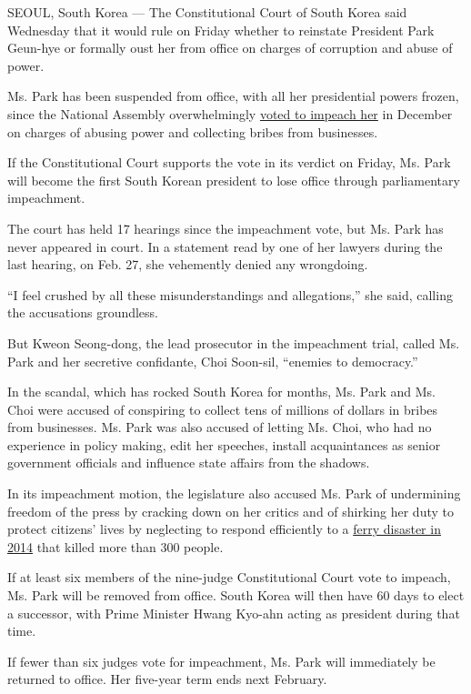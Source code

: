 SEOUL, South Korea --- The Constitutional Court of South Korea said
Wednesday that it would rule on Friday whether to reinstate President
Park Geun-hye or formally oust her from office on charges of corruption
and abuse of power.

Ms. Park has been suspended from office, with all her presidential
powers frozen, since the National Assembly overwhelmingly
\href{https://www.nytimes.com/2016/12/09/world/asia/south-korea-president-park-geun-hye-impeached.html}{voted
to impeach her} in December on charges of abusing power and collecting
bribes from businesses.

If the Constitutional Court supports the vote in its verdict on Friday,
Ms. Park will become the first South Korean president to lose office
through parliamentary impeachment.

The court has held 17 hearings since the impeachment vote, but Ms. Park
has never appeared in court. In a statement read by one of her lawyers
during the last hearing, on Feb. 27, she vehemently denied any
wrongdoing.

``I feel crushed by all these misunderstandings and allegations,'' she
said, calling the accusations groundless.

But Kweon Seong-dong, the lead prosecutor in the impeachment trial,
called Ms. Park and her secretive confidante, Choi Soon-sil, ``enemies
to democracy.''

In the scandal, which has rocked South Korea for months, Ms. Park and
Ms. Choi were accused of conspiring to collect tens of millions of
dollars in bribes from businesses. Ms. Park was also accused of letting
Ms. Choi, who had no experience in policy making, edit her speeches,
install acquaintances as senior government officials and influence state
affairs from the shadows.

In its impeachment motion, the legislature also accused Ms. Park of
undermining freedom of the press by cracking down on her critics and of
shirking her duty to protect citizens' lives by neglecting to respond
efficiently to a
\href{https://www.nytimes.com/2014/04/21/world/asia/chaos-ruled-sinking-ferry.html}{ferry
disaster in 2014} that killed more than 300 people.

If at least six members of the nine-judge Constitutional Court vote to
impeach, Ms. Park will be removed from office. South Korea will then
have 60 days to elect a successor, with Prime Minister Hwang Kyo-ahn
acting as president during that time.

If fewer than six judges vote for impeachment, Ms. Park will immediately
be returned to office. Her five-year term ends next February.

